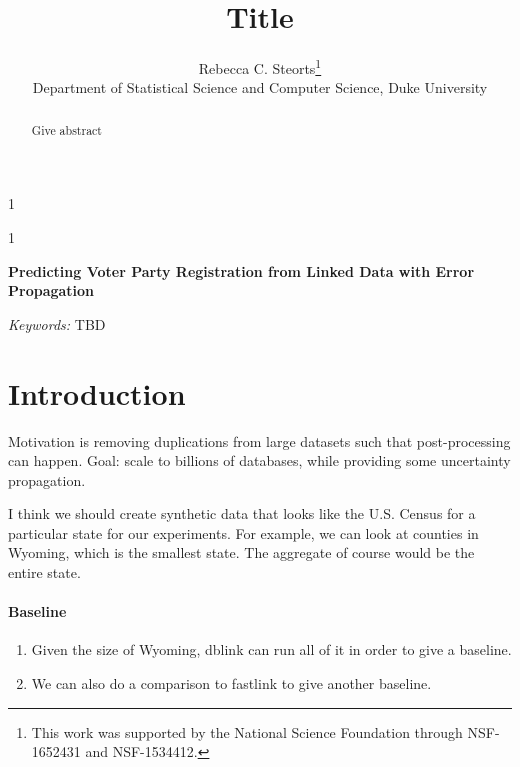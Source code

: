 \documentclass[12pt]{article}\usepackage[]{graphicx}\usepackage[]{color}
\newcommand{\blind}{1}
\begin{document}
\def\spacingset#1{\renewcommand{\baselinestretch}%
{#1}\small\normalsize} \spacingset{1}

\makeatletter
\AtBeginEnvironment{tabular}{%
  \def\baselinestretch{1}\@currsize}%
\makeatother



\blind
{
  \title{\bf Title}
  \author{Rebecca C. Steorts\thanks{
    This work was supported by the National Science Foundation through NSF-1652431 and NSF-1534412.}\hspace{.2cm}\\
    Department of Statistical Science and Computer Science, Duke University}
  \maketitle
} \fi

\blind
{
  \bigskip
  \bigskip
  \bigskip
  \begin{center}
    {\LARGE\bf Predicting Voter Party Registration from Linked Data with Error Propagation}
\end{center}
  \medskip
} \fi

\bigskip

\begin{abstract}
Give abstract 
\end{abstract}

\noindent%
{\it Keywords:}  TBD
\vfill

\newpage



\section{Introduction}
\label{sec:intro}
Motivation is removing duplications from large datasets such that post-processing can happen. Goal: scale to billions of databases, while providing some uncertainty propagation. 

I think we should create synthetic data that looks like the U.S. Census for a particular state for our experiments. For example, we can look at counties in Wyoming, which is the smallest state. The aggregate of course would be the entire state. 

\paragraph{Baseline}
\begin{enumerate}
\item Given the size of Wyoming, dblink can run all of it in order to give a baseline. 
\item We can also do a comparison to fastlink to give another baseline. 
\end{enumerate}
\end{document}
